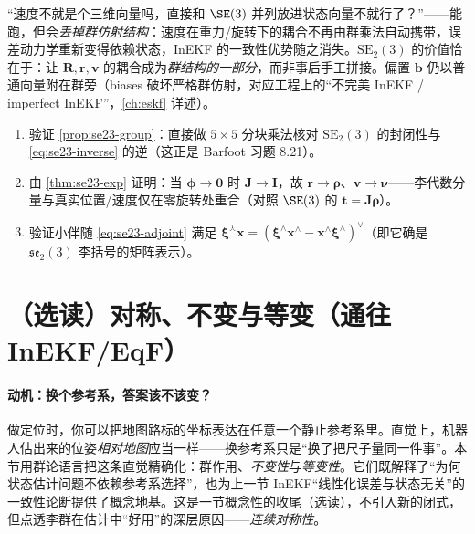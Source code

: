 \begin{pitfall}
“速度不就是个三维向量吗，直接和 $\SE(3)$ 并列放进状态向量不就行了？”——能跑，但会\emph{丢掉群仿射结构}：速度在重力/旋转下的耦合不再由群乘法自动携带，误差动力学重新变得依赖状态，InEKF 的一致性优势随之消失。$\mathrm{SE}_2(3)$ 的价值恰在于：让 $\mathbf{R},\mathbf{r},\mathbf{v}$ 的耦合成为\emph{群结构的一部分}，而非事后手工拼接。偏置 $\mathbf{b}$ 仍以普通向量附在群旁（biases 破坏严格群仿射，对应工程上的“不完美 InEKF / imperfect InEKF”，\cref{ch:eskf} 详述）。
\end{pitfall}

\begin{practice}
\begin{enumerate}
  \item 验证 \cref{prop:se23-group}：直接做 $5\times5$ 分块乘法核对 $\mathrm{SE}_2(3)$ 的封闭性与 \cref{eq:se23-inverse} 的逆（这正是 Barfoot 习题 8.21）。
  \item 由 \cref{thm:se23-exp} 证明：当 $\boldsymbol{\phi}\to\mathbf{0}$ 时 $\mathbf{J}\to\mathbf{I}$，故 $\mathbf{r}\to\boldsymbol{\rho}$、$\mathbf{v}\to\boldsymbol{\nu}$——李代数分量与真实位置/速度仅在零旋转处重合（对照 $\SE(3)$ 的 $\mathbf{t}=\mathbf{J}\boldsymbol{\rho}$）。
  \item 验证小伴随 \cref{eq:se23-adjoint} 满足 $\boldsymbol{\xi}^\curlywedge\mathbf{x}=(\boldsymbol{\xi}^\wedge\mathbf{x}^\wedge-\mathbf{x}^\wedge\boldsymbol{\xi}^\wedge)^\vee$（即它确是 $\mathfrak{se}_2(3)$ 李括号的矩阵表示）。
\end{enumerate}
\end{practice}

\section{（选读）对称、不变与等变（通往 InEKF/EqF）}
\label{sec:lie-symmetry}

\paragraph{动机：换个参考系，答案该不该变？}
做定位时，你可以把地图路标的坐标表达在任意一个静止参考系里。直觉上，机器人估出来的位姿\emph{相对地图}应当一样——换参考系只是“换了把尺子量同一件事”。本节用群论语言把这条直觉精确化：群作用、\emph{不变性}与\emph{等变性}。它们既解释了“为何状态估计问题不依赖参考系选择”，也为上一节 InEKF“线性化误差与状态无关”的一致性论断提供了概念地基\cite{barfoot2024state}。这是一节概念性的收尾（选读），不引入新的闭式，但点透李群在估计中“好用”的深层原因——\emph{连续对称性}。


